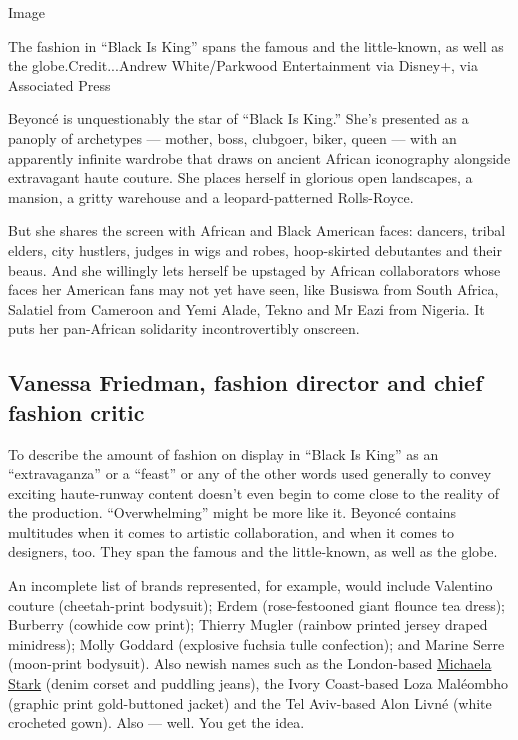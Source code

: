 Image

The fashion in ``Black Is King'' spans the famous and the little-known,
as well as the globe.Credit...Andrew White/Parkwood Entertainment via
Disney+, via Associated Press

Beyoncé is unquestionably the star of ``Black Is King.'' She's presented
as a panoply of archetypes --- mother, boss, clubgoer, biker, queen ---
with an apparently infinite wardrobe that draws on ancient African
iconography alongside extravagant haute couture. She places herself in
glorious open landscapes, a mansion, a gritty warehouse and a
leopard-patterned Rolls-Royce.

But she shares the screen with African and Black American faces:
dancers, tribal elders, city hustlers, judges in wigs and robes,
hoop-skirted debutantes and their beaus. And she willingly lets herself
be upstaged by African collaborators whose faces her American fans may
not yet have seen, like Busiswa from South Africa, Salatiel from
Cameroon and Yemi Alade, Tekno and Mr Eazi from Nigeria. It puts her
pan-African solidarity incontrovertibly onscreen.

\hypertarget{vanessa-friedman-fashion-director-and-chief-fashion-critic}{%
\subsection{Vanessa Friedman, fashion director and chief fashion
critic}\label{vanessa-friedman-fashion-director-and-chief-fashion-critic}}

To describe the amount of fashion on display in ``Black Is King'' as an
``extravaganza'' or a ``feast'' or any of the other words used generally
to convey exciting haute-runway content doesn't even begin to come close
to the reality of the production. ``Overwhelming'' might be more like
it. Beyoncé contains multitudes when it comes to artistic collaboration,
and when it comes to designers, too. They span the famous and the
little-known, as well as the globe.

An incomplete list of brands represented, for example, would include
Valentino couture (cheetah-print bodysuit); Erdem (rose-festooned giant
flounce tea dress); Burberry (cowhide cow print); Thierry Mugler
(rainbow printed jersey draped minidress); Molly Goddard (explosive
fuchsia tulle confection); and Marine Serre (moon-print bodysuit). Also
newish names such as the London-based
\href{https://www.instagram.com/p/CDTR8fsA1Y_/}{Michaela Stark} (denim
corset and puddling jeans), the Ivory Coast-based Loza Maléombho
(graphic print gold-buttoned jacket) and the Tel Aviv-based Alon Livné
(white crocheted gown). Also --- well. You get the idea.

